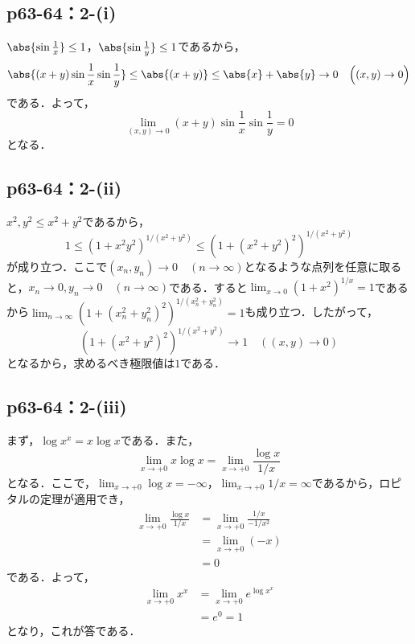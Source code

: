 \documentclass[a4paper,10pt,fleqn]{ltjsarticle}
\begin{document}
\subsection*{p63-64：2-(i)}

\begin{tleftbar}
    $\abs{\sin \frac{1}{x}} \le 1$，$\abs{\sin \frac{1}{y}} \le 1$であるから，
    \[
        \abs{(x+y) \sin \frac{1}{x} \sin \frac{1}{y}} \le \abs{(x+y)} \le \abs{x}+\abs{y} \to 0 \quad  \Bigl( (x,y) \to 0 \Bigl)
    \]
    である．よって，
    \[
        \lim_{(x,y)\to 0} (x+y) \sin \frac{1}{x} \sin \frac{1}{y} =0
    \]
    となる．
\end{tleftbar}

\subsection*{p63-64：2-(ii)}

  \begin{tleftbar}
    $x^2,y^2 \leq x^2+y^2$であるから，
    \[
      1 \leq (1 + x^2 y^2)^{1/(x^2+y^2)} \leq (1 + (x^2+y^2)^2)^{1/(x^2+y^2)}
    \]
    が成り立つ．ここで$(x_n, y_n) \to 0 \quad (n \to \infty)$となるような点列を任意に取ると，$x_n \to 0, y_n \to 0 \quad (n \to \infty)$である．すると$\lim_{x \to 0} (1+x^2)^{1/x} = 1$であるから$\lim_{n \to \infty} (1 + (x_n^2+y_n^2)^2)^{1/(x_n^2+y_n^2)} = 1$も成り立つ．したがって，
    \[
      (1 + (x^2+y^2)^2)^{1/(x^2+y^2)} \to 1 \quad ((x,y) \to 0)
    \]
    となるから，求めるべき極限値は$1$である．
  \end{tleftbar}


\subsection*{p63-64：2-(iii)}

\begin{tleftbar}
    まず，$\log x^x = x \log x$である．また，
    \[
        \lim_{x \to +0} x \log x  =\lim_{x \to +0} \frac{\log x}{1/x} 
    \]
    となる．ここで，$\lim_{x \to +0} \log x = -\infty$，$\lim_{x \to +0} 1/x =\infty$であるから，ロピタルの定理が適用でき，
    \begin{align*}
        \lim_{x \to +0} \frac{\log x}{1/x} & = \lim_{x \to +0} \frac{1/x}{-1/x^2} \\
        & = \lim_{x \to +0} (-x) \\
        & =0
    \end{align*}
    である．よって，
    \begin{align*}
    \lim_{x \to +0} x^x &= \lim_{x \to +0} e^{\log x^x} \\
    & =e^0 =1
    \end{align*}
    となり，これが答である．
\end{tleftbar}
\end{document}
